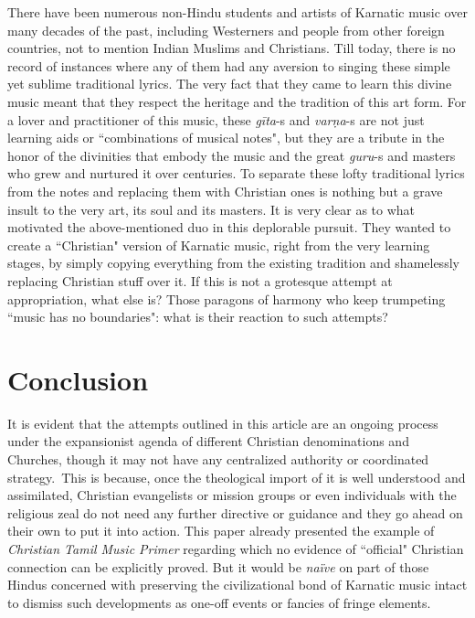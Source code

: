 There have been numerous non-Hindu students and artists of Karnatic music over many decades of the past, including Westerners and people from other foreign countries, not to mention Indian Muslims and Christians. Till today, there is no record of instances where any of them had any aversion to singing these simple yet sublime traditional lyrics. The very fact that they came to learn this divine music meant that they respect the heritage and the tradition of this art form. For a lover and practitioner of this music, these \textit{gīta}-s and \textit{varṇa}-s are not just learning aids or ``combinations of musical notes", but they are a tribute in the honor of the divinities that embody the music and the great \textit{guru}-s and masters who grew and nurtured it over centuries. To separate these lofty traditional lyrics from the notes and replacing them with Christian ones is nothing but a grave insult to the very art, its soul and its masters. It is very clear as to what motivated the above-mentioned duo in this deplorable pursuit. They wanted to create a ``Christian" version of Karnatic music, right from the very learning stages, by simply copying everything from the existing tradition and shamelessly replacing Christian stuff over it. If this is not a grotesque attempt at appropriation, what else is? Those paragons of harmony who keep trumpeting ``music has no boundaries": what is their reaction to such attempts?

\vspace{-.4cm}

\section*{Conclusion}

\vspace{-.2cm}

It is evident that the attempts outlined in this article are an ongoing process under the expansionist agenda of different Christian denominations and Churches, though it may not have any centralized authority or coordinated strategy.~This is because, once the theological import of it is well understood and assimilated, Christian evangelists or mission groups or even individuals with the religious zeal do not need any further directive or guidance and they go ahead on their own to put it into action. This paper already presented the example of \textit{Christian Tamil Music Primer} regarding which no evidence of ``official" Christian connection can be explicitly proved. But it would be \textit{naïve} on part of those Hindus concerned with preserving the civilizational bond of Karnatic music intact to dismiss such developments as one-off events or fancies of fringe elements.

